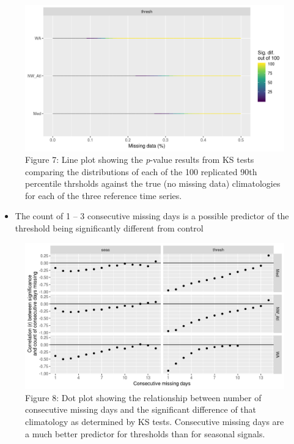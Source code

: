 \documentclass[]{article}
\providecommand{\tightlist}{%
  \setlength{\itemsep}{0pt}\setlength{\parskip}{0pt}}
\begin{document}
\begin{figure}
\centering
\includegraphics{../docs/articles/missing_data_files/figure-html/KS-clims-1.png}
\caption{Figure 7: Line plot showing the \emph{p}-value results from KS
tests comparing the distributions of each of the 100 replicated 90th
percentile thrsholds against the true (no missing data) climatologies
for each of the three reference time series.}
\end{figure}

\begin{itemize}
\tightlist
\item
  The count of 1 -- 3 consecutive missing days is a possible predictor
  of the threshold being significantly different from control
\end{itemize}

\begin{figure}
\centering
\includegraphics{../docs/articles/missing_data_files/figure-html/clim-cor-1.png}
\caption{Figure 8: Dot plot showing the relationship between number of
consecutive missing days and the significant difference of that
climatology as determined by KS tests. Consecutive missing days are a
much better predictor for thresholds than for seasonal signals.}
\end{figure}
\end{document}
